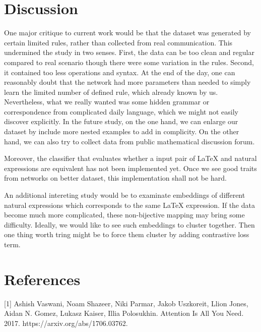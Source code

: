 \documentclass{article}
\begin{document}
\section{Discussion}
One major critique to current work would be that the dataset was generated by certain limited rules, rather than collected from real communication. This undermined the study in two senses. First, the data can be too clean and regular compared to real scenario though there were some variation in the rules. Second, it contained too less operations and syntax. At the end of the day, one can reasonably doubt that the network had more parameters than needed to simply learn the limited number of defined rule, which already known by us. Nevertheless, what we really wanted was some hidden grammar or correspondence from complicated daily language, which we might not easily discover explicitly. In the future study, on the one hand, we can enlarge our dataset by include more nested examples to add in complicity. On the other hand, we can also try to collect data from public mathematical discussion forum. \par 
Moreover, the classifier that evaluates whether a input pair of LaTeX and natural expressions are equivalent has not been implemented yet. Once we see good traits from networks on better dataset, this implementation shall not be hard. \par 
An additional intereting study would be to examinate embeddings of different natural expressions which corresponds to the same LaTeX expression. If the data become much more complicated, these non-bijective mapping may bring some difficulty. Ideally, we would like to see such embeddings to cluster together. Then one thing worth tring might be to force them cluster by adding contrastive loss term. 
%
%
\section*{References}
\small
[1] Ashish Vaswani, Noam Shazeer, Niki Parmar, Jakob Uszkoreit, Llion Jones, Aidan N. Gomez, Lukasz Kaiser, Illia Polosukhin. Attention Is All You Need. 2017. https://arxiv.org/abs/1706.03762.
%
%
\end{document}
